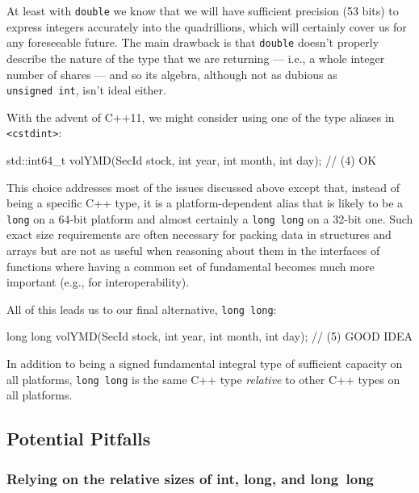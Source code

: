\noindent At least with \lstinline!double! we know that we will have sufficient precision (53 bits) to express
integers accurately into the quadrillions, which will certainly cover us
for any foreseeable future. The main drawback is that \lstinline!double!
doesn't properly describe the nature of the type that we are returning
--- i.e., a whole integer number of shares --- and so its algebra,
although not as dubious as \lstinline!unsigned!~\lstinline!int!, isn't ideal
either.

With the advent of C++11, we might consider using one of the type aliases
in \lstinline!<cstdint>!:

\begin{emcppslisting}[language=C++]
std::int64_t volYMD(SecId stock, int year, int month, int day);  // (4) OK
\end{emcppslisting}

\noindent This choice addresses most of the issues discussed above except that,
instead of being a specific C++ type, it is a platform-dependent alias
that is likely to be a \lstinline!long! on a 64-bit platform and almost
certainly a \lstinline!long!~\lstinline!long! on a 32-bit one. Such exact size
requirements are often necessary for packing data in structures and
arrays but are not as useful when reasoning about them in the
interfaces of functions where having a common set of fundamental
 becomes much more important (e.g., for
interoperability).

All of this leads us to our final alternative, \lstinline!long!~\lstinline!long!:

\begin{emcppslisting}[language=C++]
long long volYMD(SecId stock, int year, int month, int day);  // (5) GOOD IDEA
\end{emcppslisting}

\noindent In addition to being a signed fundamental integral type of sufficient
capacity on all platforms, \lstinline!long!~\lstinline!long! is the same C++
type \emph{relative} to other C++ types on all platforms.

\subsection[Potential Pitfalls]{Potential Pitfalls}\label{longlong-potential-pitfalls}

\subsubsection[Relying on the relative sizes of \lstinline!int!, \lstinline!long!, and \lstinline!long!~\lstinline!long!]{Relying on the relative sizes of {\SubsubsecCode int}, {\SubsubsecCode long}, and {\SubsubsecCode long}~{\SubsubsecCode long}}\label{relying-on-the-relative-sizes-of-int,-long,-and-long-long}

